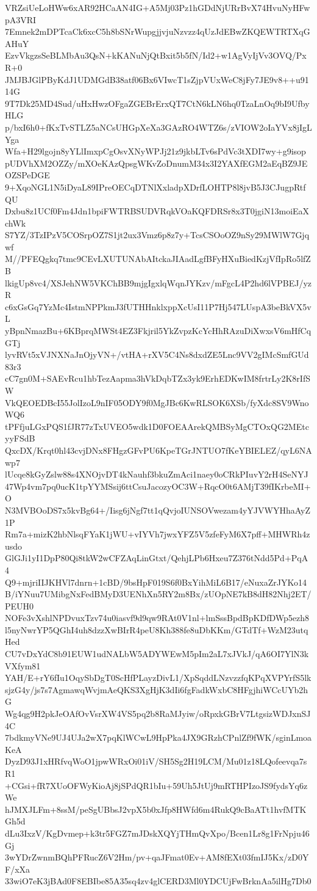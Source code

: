 VRZsiUeLoHWw6xAR92HCaAN4IG+A5Mj03Pz1hGDdNjURrBvX74HvuNyHFwpA3VRI
7Emnek2mDPTcaCk6xcC5h8bSNrWupgjjvjuNzvzz4qUzJdEBwZKQEWTRTXqGAHuY
EzvVkgzsSeBLMbAu3QsN+kKANuNjQtBxit5b5fN/Id2+w1AgVyIjVv3OVQ/PxR+0
JMJBJGlPByKdJ1UDMGdB38atf06Bx6VIwcT1sZjpVUxWeC8jFy7JE9v8++u9114G
9T7Dk25MD4Sud/uHxHwzOFgaZGEBrErxQT7CtN6kLN6hq0TzaLnOq9bI9UfbyHLG
p/bxI6h0+fKxTvSTLZ5aNCsUHGpXeXa3GAzRO4WTZ6s/zVIOW2oIaYVx8jIgLYga
Wfa+H29lgojn8yYLlImxpCgOsvXNyWPJj21z9jkbLTv6sPdVc3tXDI7wy+g9isop
pUDVhXM2OZZy/mXOeKAzQpsgWKvZoDnumM34x3I2YAXfEGM2aEqBZ9JEOZSPeDGE
9+XqoNGL1N5iDyaL89IPreOECqDTNlXxladpXDrfLOHTP8l8jvB5J3CJugpRtfQU
Dxbu8z1UCf0Fm4Jdn1bpiFWTRBSUDVRqkVOaKQFDRSr8x3T0jgiN13moiEaXchWk
S7YZ/3TzIPzV5COSrpOZ7S1jt2ux3Vmz6p8z7y+TcsCSOoOZ9nSy29MWlW7Gjqwf
M//PFEQgkq7tmc9CEvLXUTUNAbAItckaJIAadLgfBFyHXuBiedKzjVfIpRo5lfZB
lkigUp8vc4/XSJehNW5VKChBB9mjgIgxlqWqnJYKzv/mFgcL4P2hd6lVPBEJ/yzR
c6xGsGq7YzMc4IstmNPPkmJ3fUTHHnklxppXcUsI11P7Hj547LUspA3beBkVX5vL
yBpnNmazBu+6KBprqMWSt4EZ3Fkjril5YkZvpzKcYcHhRAzuDiXwxsV6mHfCqGTj
lyvRVt5xVJNXNaJnOjyVN+/vtHA+rXV5C4Ns8dxdZE5Lnc9VV2gIMcSmfGUd83r3
cC7gn0M+SAEvRcu1hbTezAapma3hVkDqbTZx3yk9ErhEDKwIM8frtrLy2K8rIfSW
VkQEOEDBcI55JolIzoL9nIF05ODY9f0MgJBc6KwRLSOK6XSb/fyXdc8SV9WnoWQ6
tPFfjuLGxPQS1fJR77zTxUVEO5wdk1D0FOEAArekQMBSyMgCTOxQG2MEtcyyFSdB
QxcDX/Krqt0hl43cvjDNx8FHgzGFvPU6KpeTGrJNTUO7fKeYBIELEZ/qyL6NAwp7
lUcqe8kGyZslw88s4XNOjvDT4kNauhf3bkuZmAci1naey0oCRkPIuvY2rH4SeNYJ
47Wp4vm7pq0ucK1tpYYMSsij6ttCsuJacozyOC3W+RqcO0t6AMjT39fIKrbeMI+O
N3MVBOoDS7x5kvBg64+/Iisg6jNgf7tt1qQvjoIUNSOVwezam4yYJVWYHhaAyZ1P
Rm7a+mizK2hbNlsqFYaK1jWU+vIYVh7jwxYFZ5V5zfeFyM6X7pff+MHWRh4zusdo
GlGJi1yI1DpP80Qi8tkW2wCFZAqLinGtxt/QehjLPb6Hxeu7Z376tNdd5Pd+PqA4
Q9+mjriIIJKHVl7dnrn+1cBD/9bsHpF019S6f0BxYihMiL6B17/eNuxaZrJYKo14
B/iYNuu7UMibgNxFedBMyD3UENhXn5RY2m8Bx/zUOpNE7kB8dH82Nhj2ET/PEUH0
NOFe3vXshlNPDvuxTzv74u0iasvf9d9qw9RAt0V1nl+lmSssBpdBpKDfDWp5ezh8
l5nyNwrYP5QGhI4uh8dzzXwBIrR4peU8Kh388fe8uDbKKm/GTdTf+WzM23utqHed
CU7vDxYdC8b91EUW1udNALbW5ADYWEwM5pIm2aL7xJVkJ/qA6OI7YlN3kVXfym81
YAH/E+rY6fIu1OqySbDgT0ScHfPLayzDivL1/XpSqddLNzvzzfqKPqXVPYrfS5lk
sjzG4y/js7s7AgmawqWvjmAeQKS3XgHjK3dIi6fgFadkWxbC8HFgjhiWCcUYb2hG
Wg4qg9H2pkJeOAfOvVsrXW4VS5pq2b8RaMJyiw/oRpxkGBrV7LtgsizWDJxnSJ4C
7bdkmyVNe9UJ4UJa2wX7pqKlWCwL9HpPka4JX9GRzhCPnlZf9fWK/sginLmoaKeA
DyzD93J1xHRfvqWoO1jpwWRxOi01iV/SH5Sg2H19LCM/Mu01z18LQofeevqa7sR1
+CGsi+fR7XUoOFWyKioAj8jSPdQR1bIu+59Uh5JtUj9mRTHPIzoJS9fydsYq6zWe
hJMXJLFm+8ssM/peSgUBbsJ2vpX5b0xJfp8HWfd6m4RukQ9cBaATt1hvfMTKGh5d
dLu3IxzV/KgDvmep+k3tr5FGZ7mJDskXQYjTHmQvXpo/Bcen1Lr8g1FrNpju46Gj
3wYDrZwnmBQhPFRucZ6V2Hm/pv+qaJFmat0Ev+AM8fEXt03fmIJ5Kx/zD0YF/xXa
33wiO7eK3jBAd0F8EBIbe85A35sq4zv4glCERD3Ml0YDCUjFwBrknAa5ilHg7Db0
